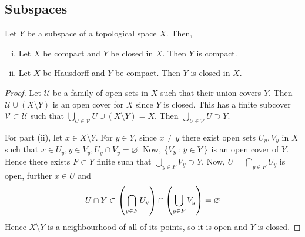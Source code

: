 \subsection{Subspaces}
\begin{theorem}
	Let \( Y \) be a subspace of a topological space \( X \).
	Then,
	\begin{enumerate}[(i)]
		\item Let \( X \) be compact and \( Y \) be closed in \( X \).
		      Then \( Y \) is compact.
		\item Let \( X \) be Hausdorff and \( Y \) be compact.
		      Then \( Y \) is closed in \( X \).
	\end{enumerate}
\end{theorem}
\begin{proof}
	Let \( \mathcal U \) be a family of open sets in \( X \) such that their union covers \( Y \).
	Then \( \mathcal U \cup (X \setminus Y) \) is an open cover for \( X \) since \( Y \) is closed.
	This has a finite subcover \( \mathcal V \subset \mathcal U \) such that \( \bigcup_{U \in \mathcal V} U \cup (X \setminus Y) = X \).
	Then \( \bigcup_{U \in \mathcal V} U \supset Y \).

	For part (ii), let \( x \in X \setminus Y \).
	For \( y \in Y \), since \( x \neq y \) there exist open sets \( U_y, V_y \) in \( X \) such that \( x \in U_y, y \in V_y, U_y \cap V_y = \varnothing \).
	Now, \( \qty{V_y \colon y \in Y} \) is an open cover of \( Y \).
	Hence there exists \( F \subset Y \) finite such that \( \bigcup_{y \in F} V_y \supset Y \).
	Now, \( U = \bigcap_{y \in F} U_y \) is open, further \( x \in U \) and
	\[
		U \cap Y \subset \qty(\bigcap_{y \in F} U_y) \cap \qty(\bigcup_{y \in F} V_y) = \varnothing
	\]
	Hence \( X \setminus Y \) is a neighbourhood of all of its points, so it is open and \( Y \) is closed.
\end{proof}

